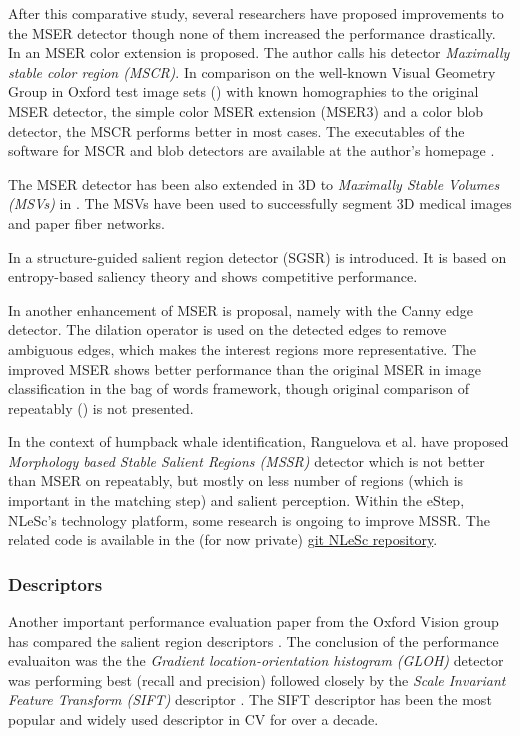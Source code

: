 After this comparative study, several researchers have proposed improvements to the MSER detector though none of them increased the performance drastically. 
In \cite{Forssen07} an MSER color extension is proposed. The author calls his detector {\em Maximally stable color region (MSCR)}. In comparison on the well-known Visual Geometry Group in Oxford test image sets (\cite{vgg_soft_data}) with known homographies to the original MSER detector, the simple color MSER extension (MSER3) and a color blob detector, the MSCR performs better in most cases. The executables of the software for MSCR and blob detectors are available at the author's homepage \cite{forssen07_soft}.

The MSER detector has been also extended in 3D to {\em Maximally Stable Volumes (MSVs)} in \cite{DonoserB06}. The MSVs have been used to successfully segment 3D medical images and paper fiber networks.

In \cite{Fan08} a structure-guided salient region detector (SGSR) is introduced. It is based on entropy-based saliency theory and shows competitive performance.

In \cite{Wang14} another enhancement of MSER is proposal, namely with the Canny edge detector. The dilation operator is used on the detected edges to remove ambiguous edges, which makes the interest regions more representative. The improved MSER shows better performance than the original MSER in image classification in the bag of words framework, though original comparison of repeatably (\cite{Mikolajczyk:2005}) is not presented. 

In the context of humpback whale identification, Ranguelova et al. \cite{RangMSSR06, RangHumpb06} have proposed {\em Morphology based Stable Salient Regions (MSSR) } detector which is not better than MSER on repeatably, but mostly on less number of regions (which is important in the matching step) and salient perception. Within the eStep, NLeSc's technology platform, some research is ongoing to improve MSSR. The related code is available in the (for now private) \href{https://github.com/NLeSC/LargeScaleImaging/tree/master/Software}{git NLeSc repository}.

\subsubsection{Descriptors}
Another important performance evaluation paper from the Oxford Vision group has compared the salient region descriptors \cite{MS05}. The conclusion of the performance evaluaiton was the the {\em Gradient location-orientation histogram (GLOH)} detector was performing best (recall and precision) followed closely by the {\em Scale Invariant Feature Transform (SIFT)} descriptor \cite{Lowe:2004}. The SIFT descriptor has been the most popular and widely used descriptor in CV for over a decade. 

